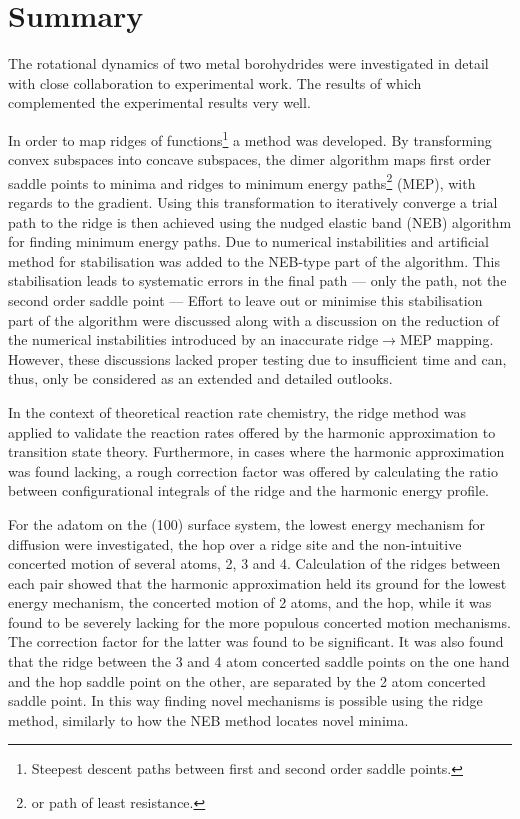 \chapter{Summary}
\label{chap:summary}

The rotational dynamics of two metal borohydrides were investigated in detail with close collaboration to experimental work.
The results of which complemented the experimental results very well.
\expand

In order to map ridges of functions\footnote{Steepest descent paths between first and second order saddle points.} a method was developed.
By transforming convex subspaces into concave subspaces, the dimer algorithm maps first order saddle points to minima and ridges to minimum energy paths\footnote{or path of least resistance.} (MEP), with regards to the gradient.
Using this transformation to iteratively converge a trial path to the ridge is then achieved using the nudged elastic band (NEB) algorithm for finding minimum energy paths.
Due to numerical instabilities and artificial method for stabilisation was added to the NEB-type part of the algorithm.
This stabilisation leads to systematic errors in the final path --- only the path, not the second order saddle point ---
Effort to leave out or minimise this stabilisation part of the algorithm were discussed along with a discussion on the reduction of the numerical instabilities introduced by an inaccurate ridge$\rightarrow$MEP mapping.
However, these discussions lacked proper testing due to insufficient time and can, thus, only be considered as an extended and detailed outlooks.

In the context of theoretical reaction rate chemistry, the ridge method was applied to validate the reaction rates offered by the harmonic approximation to transition state theory.
Furthermore, in cases where the harmonic approximation was found lacking, a rough correction factor was offered by calculating the ratio between configurational integrals of the ridge and the harmonic energy profile.

For the  adatom on the (100) surface system, the lowest energy mechanism for diffusion were investigated, the hop over a ridge site and the non-intuitive concerted motion of several atoms, 2, 3 and 4.
Calculation of the ridges between each pair showed that the harmonic approximation held its ground for the lowest energy mechanism, the concerted motion of 2 atoms, and the hop, while it was found to be severely lacking for the more populous concerted motion mechanisms.
The correction factor for the latter was found to be significant.
It was also found that the ridge between the 3 and 4 atom concerted saddle points on the one hand and the hop saddle point on the other, are separated by the 2 atom concerted saddle point.
In this way finding novel mechanisms is possible using the ridge method, similarly to how the NEB method locates novel minima.

